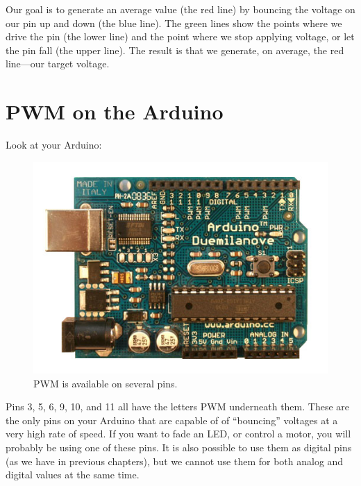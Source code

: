 Our goal is to generate an average value (the red line) by bouncing the voltage on our pin up and down (the blue line). The green lines show the points where we drive the pin \HIGH (the lower line) and the point where we stop applying voltage, or let the pin fall \LOW (the upper line). The result is that we generate, on average, the red line---our target voltage. 

\section{PWM on the Arduino}

Look at your Arduino:

\vspace{3mm}
\begin{figure}[ht]
  \begin{center}
    \includegraphics[width=0.9\linewidth]{images/ch7-arduino}
    \caption{PWM is available on several pins.}
    \label{image:ch7-arduino}
  \end{center}
\end{figure}

Pins 3, 5, 6, 9, 10, and 11 all have the letters {\strong PWM} underneath them. These are the only pins on your Arduino that are capable of of ``bouncing'' voltages at a very high rate of speed. If you want to fade an LED, or control a motor, you will probably be using one of these pins. It is also possible to use them as digital pins (as we have in previous chapters), but we cannot use them for both analog and digital values at the same time.

